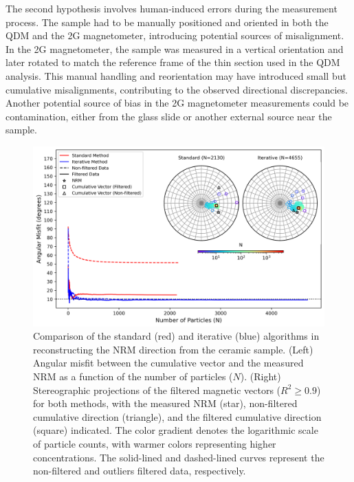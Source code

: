 The second hypothesis involves human-induced errors during the measurement process. The sample had to be manually positioned and oriented in both the QDM and the 2G magnetometer, introducing potential sources of misalignment. In the 2G magnetometer, the sample was measured in a vertical orientation and later rotated to match the reference frame of the thin section used in the QDM analysis. This manual handling and reorientation may have introduced small but cumulative misalignments, contributing to the observed directional discrepancies. Another potential source of bias in the 2G magnetometer measurements could be contamination, either from the glass slide or another external source near the sample.

\begin{figure}[tb!]
  \centering
  \includegraphics[width=1\linewidth]{micromag-interfering-sources/figures/ceramic-data-stereoplot.png}
  \caption{
  Comparison of the standard (red) and iterative (blue) algorithms in reconstructing the NRM direction from the ceramic sample. (Left) Angular misfit between the cumulative vector and the measured NRM as a function of the number of particles ($N$). (Right) Stereographic projections of the filtered magnetic vectors ($R^2 \geq 0.9$) for both methods, with the measured NRM (star), non-filtered cumulative direction (triangle), and the filtered cumulative direction (square) indicated. The color gradient denotes the logarithmic scale of particle counts, with warmer colors representing higher concentrations. The solid-lined and dashed-lined curves represent the non-filtered and outliers filtered data, respectively.
  }
  \label{ceramic-data-stereograms}
\end{figure}

